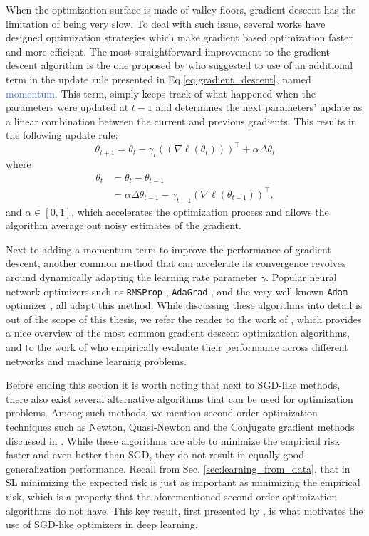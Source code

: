 When the optimization surface is made of valley floors, gradient descent has the limitation of being very slow. To deal with such issue, several works have designed optimization strategies which make gradient based optimization faster and more efficient. The most straightforward improvement to the gradient descent algorithm is the one proposed by \citet{rumelhart1986learning} who suggested to use of an additional term in the update rule presented in Eq.\ref{eq:gradient_descent}, named \textcolor{RoyalBlue}{momentum}. This term, simply keeps track of what happened when the parameters were updated at $t-1$ and determines the next parameters' update as a linear combination between the current and previous gradients. This results in the following update rule:
\begin{equation}
	\theta_{t+1} = \theta_t - \gamma_t ((\nabla \ell(\theta_t)))^{\intercal} + \alpha\Delta\theta_t
	\label{eq: momentum}
\end{equation}
where  
\begin{align}
	\theta_{t} & = \theta_t - \theta_{t-1} \\ 
		   & = \alpha\Delta\theta_{t-1}-\gamma_{t-1}(\nabla \ell(\theta_{t-1}))^{\intercal},
	\label{eq:gradient_descent}
\end{align}
and $\alpha\in[0,1]$, which accelerates the optimization process and allows the algorithm average out noisy estimates of the gradient.

Next to adding a momentum term to improve the performance of gradient descent, another common method that can accelerate its convergence revolves around dynamically adapting the learning rate parameter $\gamma$. Popular neural network optimizers such as \texttt{RMSProp} \cite{tieleman2012lecture}, \texttt{AdaGrad} \cite{duchi2011adaptive}, and the very well-known \texttt{Adam} optimizer \cite{kingma2014adam}, all adapt this method. While discussing these algorithms into detail is out of the scope of this thesis, we refer the reader to the work of \citet{ruder2016overview}, which provides a nice overview of the most common gradient descent optimization algorithms, and to the work of \citet{schmidt2020descending} who empirically evaluate their performance across different networks and machine learning problems. 

Before ending this section it is worth noting that next to SGD-like methods, there also exist several alternative algorithms that can be used for optimization problems. Among such methods, we mention second order optimization techniques such as Newton, Quasi-Newton and the Conjugate gradient methods discussed in \cite{tan2019review}. While these algorithms are able to minimize the empirical risk faster and even better than SGD, they do not result in equally good generalization performance. Recall from Sec. \ref{sec:learning_from_data}, that in SL minimizing the expected risk is just as important as minimizing the empirical risk, which is a property that the aforementioned second order optimization algorithms do not have. This key result, first presented by \citet{bottou201113}, is what motivates the use of SGD-like optimizers in deep learning.       

